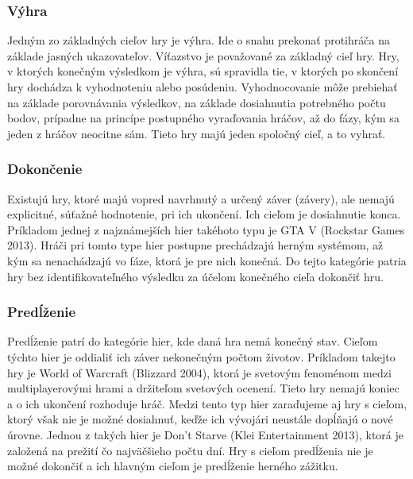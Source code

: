 \documentclass[10pt,twoside,slovak,a4paper]{article}
\begin{document}
\subsubsection{Výhra}
Jedným zo základných cieľov hry je výhra.  Ide o snahu prekonať protihráča na základe jasných ukazovateľov. Víťazstvo je považované za základný cieľ hry. Hry,  v ktorých konečným výsledkom je výhra, sú spravidla tie, v ktorých po skončení hry dochádza k vyhodnoteniu alebo posúdeniu\cite{zagal2019ultimate}. Vyhodnocovanie môže prebiehať na základe porovnávania výsledkov, na základe dosiahnutia potrebného počtu bodov,  prípadne na princípe postupného vyraďovania hráčov, až do fázy, kým sa jeden z hráčov neocitne sám. Tieto hry majú jeden spoločný cieľ, a to vyhrať.

\subsubsection{Dokončenie}
Existujú hry, ktoré majú vopred navrhnutý a určený záver (závery), ale nemajú explicitné, súťažné hodnotenie, pri ich ukončení\cite{zagal2019ultimate}. Ich cieľom je dosiahnutie konca.  Príkladom jednej z najznámejších hier takéhoto typu je GTA V (Rockstar Games 2013).  Hráči pri tomto type hier postupne prechádzajú herným systémom, až kým sa nenachádzajú vo fáze, ktorá je pre nich konečná. Do tejto kategórie patria hry bez identifikovateľného výsledku za účelom konečného cieľa dokončiť hru.

\subsubsection{Predĺženie}
Predĺženie patrí do kategórie hier, kde daná hra nemá konečný stav. Cieľom týchto hier je oddialiť ich záver nekonečným počtom životov.  Príkladom takejto hry je World of Warcraft (Blizzard 2004), ktorá je svetovým fenoménom medzi multiplayerovými hrami a držiteľom svetových ocenení.  Tieto hry nemajú koniec a o ich ukončení rozhoduje hráč. Medzi tento typ hier zaraďujeme aj hry s cieľom, ktorý však nie je možné dosiahnuť, keďže ich vývojári neustále dopĺňajú o nové úrovne. Jednou z takých hier je Don't Starve (Klei Entertainment 2013), ktorá je založená na prežití čo najväčšieho počtu dní. Hry s cieľom predĺženia nie je možné dokončiť a ich hlavným cieľom je predĺženie herného zážitku.
\end{document}
